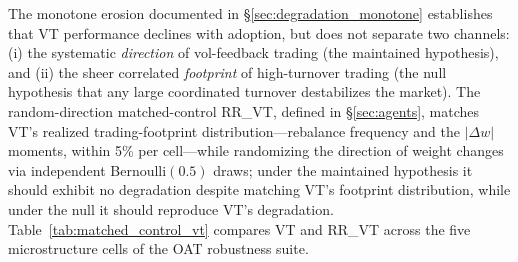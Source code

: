 \documentclass[12pt,a4paper]{article}
\begin{document}
The monotone erosion documented in \S\ref{sec:degradation_monotone} establishes that VT performance declines with adoption, but does not separate two channels: (i) the systematic \emph{direction} of vol-feedback trading (the maintained hypothesis), and (ii) the sheer correlated \emph{footprint} of high-turnover trading (the null hypothesis that any large coordinated turnover destabilizes the market). The random-direction matched-control RR\_VT, defined in \S\ref{sec:agents}, matches VT's realized trading-footprint distribution---rebalance frequency and the $|\Delta w|$ moments, within 5\% per cell---while randomizing the direction of weight changes via independent Bernoulli$(0.5)$ draws; under the maintained hypothesis it should exhibit no degradation despite matching VT's footprint distribution, while under the null it should reproduce VT's degradation. Table~\ref{tab:matched_control_vt} compares VT and RR\_VT across the five microstructure cells of the OAT robustness suite.
\end{document}
